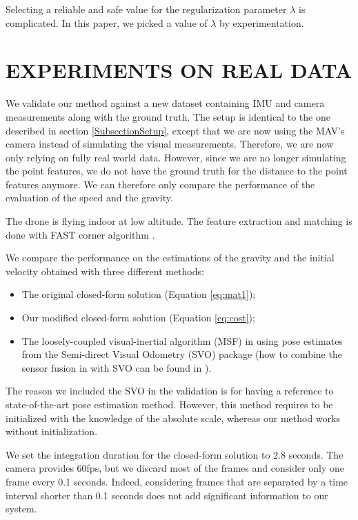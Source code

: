 \documentclass[letterpaper, 10 pt, conference]{ieeeconf}  %
\begin{document}
Selecting a reliable and safe value for the regularization parameter $\lambda$ is complicated.
In this paper, we picked a value of $\lambda$ by experimentation.

\section{EXPERIMENTS ON REAL DATA}\label{SectionPerformance}

We validate our method against a new dataset containing IMU and camera measurements along with the ground truth.
The setup is identical to the one described in section \ref{SubsectionSetup}, except that we are now using the MAV's camera instead of simulating the visual measurements.
Therefore, we are now only relying on fully real world data.
However, since we are no longer simulating the point features, we do not have the ground truth for the distance to the point features anymore.
We can therefore only compare the performance of the evaluation of the speed and the gravity.

The drone is flying indoor at low altitude.
The feature extraction and matching is done with FAST corner algorithm \cite{Rosten2005}\cite{Rosten2006}.

We compare the performance on the estimations of the gravity and the initial velocity obtained with three different methods:
\begin{itemize}
\item The original closed-form solution (Equation \ref{eq:mat1});
\item Our modified closed-form solution (Equation \ref{eq:cost});
\item The loosely-coupled visual-inertial algorithm (MSF) in \cite{LynenIROS13} using pose estimates from the Semi-direct Visual Odometry (SVO) package \cite{Forster2014} (how to combine the sensor fusion in \cite{LynenIROS13} with SVO can be found in \cite{FaesslerICRA15}).
\end{itemize}
The reason we included the SVO in the validation is for having a reference to state-of-the-art pose estimation method.
However, this method requires to be initialized with the knowledge of the absolute scale, whereas our method works without initialization.

We set the integration duration for the closed-form solution to 2.8 seconds.
The camera provides 60fps, but we discard most of the frames and consider only one frame every 0.1 seconds.
Indeed, considering frames that are separated by a time interval shorter than 0.1 seconds does not add significant information to our system.
\end{document}
